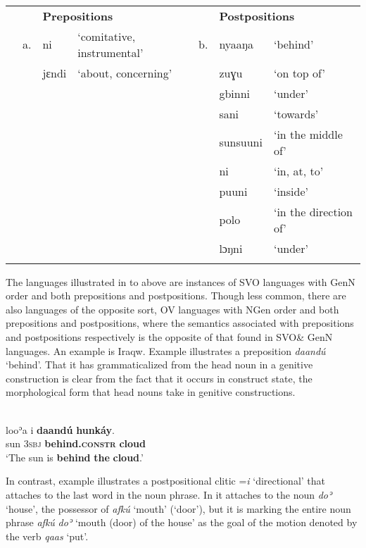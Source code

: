 \documentclass[output=paper]{langsci/langscibook}
\begin{document}
\begin{table}
\\
\begin{tabularx}{\textwidth}{XXXXXXX} &  & \multicolumn{2}{X}{\bfseries Prepositions} &  & \multicolumn{2}{X}{\bfseries Postpositions}\\
\lsptoprule
& a. & ni & ‘comitative, instrumental’ & b. & nyaaŋa & ‘behind’\\
&  & jɛndi & ‘about, concerning’ &  & zuɣu & ‘on top of’\\
&  &  &  &  & gbinni & ‘under’\\
&  &  &  &  & sani & ‘towards’\\
&  &  &  &  & sunsuuni & ‘in the middle of’\\
&  &  &  &  & ni & ‘in, at, to’\\
&  &  &  &  & puuni & ‘inside’\\
&  &  &  &  & polo & ‘in the direction of’\\
&  &  &  &  & lɔŋni & ‘under’\\
\lspbottomrule
\end{tabularx}
\end{table}


The languages illustrated in  to  above are instances of SVO languages with GenN order and both prepositions and postpositions. Though less common, there are also languages of the opposite sort, OV languages with NGen order and both prepositions and postpositions, where the semantics associated with prepositions and postpositions respectively is the opposite of that found in SVO\& GenN languages. An example is Iraqw. Example  illustrates a preposition \textit{daandú} ‘behind’. That it has grammaticalized from the head noun in a genitive construction is clear from the fact that it occurs in construct state, the morphological form that head nouns take in genitive constructions.

\ea\label{ex:dryer:}
\\
\gll   looʾa  i  \textbf{daandú}  \textbf{hunkáy}.\\
       sun  3\textsc{sbj}  \textbf{behind.\textsc{constr}}  \textbf{cloud} \\
\glt ‘The sun is \textbf{behind} \textbf{the} \textbf{cloud}.’
\z

In contrast, example  illustrates a postpositional clitic =\textit{i} ‘directional’ that attaches to the last word in the noun phrase. In  it attaches to the noun \textit{doʾ} ‘house’, the possessor of \textit{afkú} ‘mouth’ (‘door’), but it is marking the entire noun phrase \textit{afkú} \textit{doʾ} ‘mouth (door) of the house’ as the goal of the motion denoted by the verb \textit{qaas} ‘put’.
\end{document}
